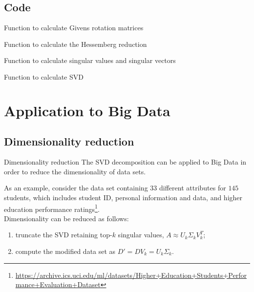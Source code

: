 \documentclass[10pt]{beamer}
\begin{document}
\subsection{Code}

\begin{frame}[fragile]{Function to calculate Givens rotation matrices}
    
\end{frame}

\begin{frame}{Function to calculate the Hessemberg reduction}
    
\end{frame}

\begin{frame}{Function to calculate singular values and singular vectors}
    
\end{frame}

\begin{frame}{Function to calculate SVD}
    
\end{frame}

\section{Application to Big Data}

\subsection{Dimensionality reduction}

\begin{frame}{Dimensionality reduction}
    The SVD decomposition can be applied to Big Data in order to reduce the dimensionality of data sets. \\ \bigskip

    As an example, consider the data set \cite{10.1007/978-3-030-35249-3_76} containing $33$ different attributes for $145$ students, which includes student ID, personal information and data, and higher education performance ratings\footnote{\url{https://archive.ics.uci.edu/ml/datasets/Higher+Education+Students+Performance+Evaluation+Dataset}}. \\
    Dimensionality can be reduced as follows:
    \begin{enumerate}
        \item truncate the SVD retaining top-$k$ singular values, $A \approx U_k \Sigma_k V_k^T$;
        \item compute the modified data set as $D' = D V_k = U_k \Sigma_k$.
    \end{enumerate}
\end{frame}
\end{document}
